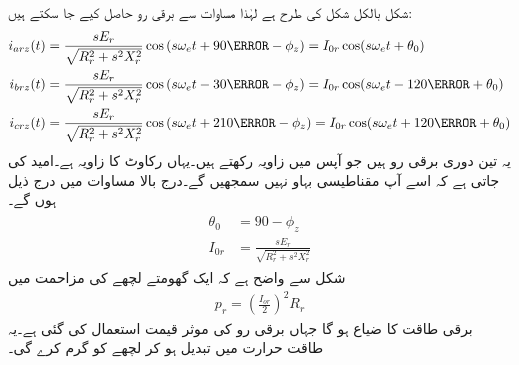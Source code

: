 شکل  بالکل شکل   کی طرح ہے لہٰذا مساوات   سے برقی رو حاصل کیے جا سکتے ہیں:
\begin{gather}
\begin{aligned}
i_{arz}(t)&=\frac{s E_r}{\sqrt{R_r^2+s^2 X_r^2}} \cos \left(s \omega_e t +90\degree-\phi_z \right)=I_{0r} \cos (s \omega_e t +\theta_0)\\
i_{brz}(t)&=\frac{s E_r}{\sqrt{R_r^2+s^2 X_r^2}} \cos \left(s \omega_e t -30\degree-\phi_z \right)=I_{0r} \cos (s \omega_e t -120 \degree+\theta_0)\\
i_{crz}(t)&=\frac{s E_r}{\sqrt{R_r^2+s^2 X_r^2}} \cos \left(s \omega_e t +210\degree-\phi_z \right)=I_{0r} \cos (s \omega_e t+120\degree +\theta_0)
\end{aligned}
\end{gather}
یہ تین دوری برقی رو ہیں جو آپس میں   زاویہ رکھتے ہیں۔یہاں  رکاوٹ کا زاویہ ہے۔امید کی جاتی ہے کہ اسے آپ مقناطیسی بہاو نہیں سمجھیں گے۔درج بالا مساوات میں درج ذیل ہوں گے۔
\begin{gather}
\begin{aligned}\label{مساوات_امالی_گھومتا_رو}
\theta_0&=90-\phi_z \\
I_{0r}&=\frac{s E_r}{\sqrt{R_r^2+s^2 X_r^2}}
\end{aligned}
\end{gather}
شکل   سے واضح ہے کہ ایک گھومتے لچھے کی مزاحمت میں 
\begin{align}\label{مساوات_امالی_طاقت_ضیاع_گھمتا_حصہ}
p_r =\left(\frac{I_{or}}{2}\right)^2 R_r
\end{align}
برقی طاقت کا ضیاع ہو گا جہاں برقی رو کی موثر قیمت استعمال کی گئی ہے۔یہ طاقت حرارت میں تبدیل ہو کر  لچھے کو گرم کرے گی۔

